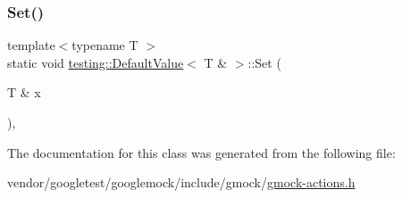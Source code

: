 \mbox{\label{classtesting_1_1_default_value_3_01_t_01_6_01_4_a9863abf3d311ce5007d7e57dfce2f252}} 
\subsubsection{\texorpdfstring{Set()}{Set()}}
{\footnotesize\ttfamily template$<$typename T $>$ \\
static void \hyperlink{classtesting_1_1_default_value}{testing\+::\+Default\+Value}$<$ T \& $>$\+::Set (\begin{DoxyParamCaption}\item[{T \&}]{x }\end{DoxyParamCaption})\hspace{0.3cm}{\ttfamily [inline]}, {\ttfamily [static]}}



The documentation for this class was generated from the following file\+:\begin{DoxyCompactItemize}
\item 
vendor/googletest/googlemock/include/gmock/\hyperlink{gmock-actions_8h}{gmock-\/actions.\+h}\end{DoxyCompactItemize}
